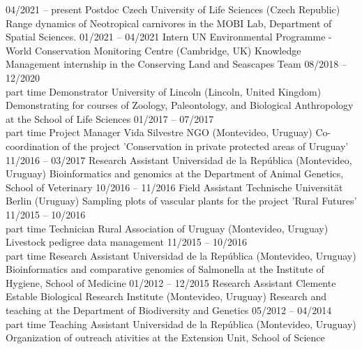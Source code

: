 \documentclass[9pt]{developercv} %
\begin{document}
\begin{entrylist}
	\entry
		{04/2021 -- present}
		{Postdoc}
		{Czech University of Life Sciences (Czech Republic)}
		{Range dynamics of Neotropical carnivores in the MOBI Lab, Department of Spatial Sciences.}
	\entry
		{01/2021 -- 04/2021}
		{Intern}
		{UN Environmental Programme - World Conservation Monitoring Centre (Cambridge, UK)}
		{Knowledge Management internship in the Conserving Land and Seascapes Team}
	\entry
		{08/2018 -- 12/2020\\\footnotesize{part time}}
		{Demonstrator}
		{University of Lincoln (Lincoln, United Kingdom)}
		{Demonstrating for courses of Zoology, Paleontology, and Biological Anthropology at the School of Life Sciences}
	\entry
		{01/2017 -- 07/2017\\\footnotesize{part time}}
		{Project Manager}
		{Vida Silvestre NGO (Montevideo, Uruguay)}
		{Co-coordination of the project 'Conservation in private protected areas of Uruguay'}
	\entry
		{11/2016 -- 03/2017}
		{Research Assistant}
		{Universidad de la Rep\'{u}blica (Montevideo, Uruguay)}
		{Bioinformatics and genomics at the Department of Animal Genetics, School of Veterinary}
	\entry
		{10/2016 -- 11/2016}
		{Field Assistant}
		{Technische Universität Berlin (Uruguay)}
		{Sampling plots of vascular plants for the project 'Rural Futures'}
	\entry
		{11/2015 -- 10/2016\\\footnotesize{part time}}
		{Technician}
		{Rural Association of Uruguay (Montevideo, Uruguay)}
		{Livestock pedigree data management}
	\entry
		{11/2015 -- 10/2016\\\footnotesize{part time}}
		{Research Assistant}
		{Universidad de la Rep\'{u}blica (Montevideo, Uruguay)}
		{Bioinformatics and comparative genomics of Salmonella at the Institute of Hygiene, School of Medicine}
	\entry
		{01/2012 -- 12/2015}
		{Research Assistant}
		{Clemente Estable Biological Research Institute (Montevideo, Uruguay)}
		{Research and teaching at the Department of Biodiversity and Genetics}
	\entry
		{05/2012 -- 04/2014\\\footnotesize{part time}}
		{Teaching Assistant}
		{Universidad de la Rep\'{u}blica (Montevideo, Uruguay)}
		{Organization of outreach ativities at the Extension Unit, School of Science}
\end{entrylist}
\end{document}
